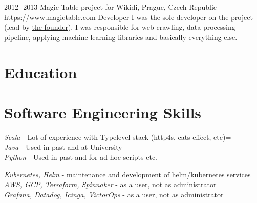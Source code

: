 \documentclass[10pt]{article} %
\begin{document}

    \job
    {2012 -}{2013}
    {Magic Table project for Wikidi, Prague, Czech Republic}
    {https://www.magictable.com}
    {Developer}
    {I was the sole developer on the project (lead by \href{https://michal.illich.cz/}{the founder}). I was responsible for web-crawling, data processing pipeline, applying machine learning libraries and basically everything else. \\
    }




    \section{Education}




    \section{Software Engineering Skills}

    {
        \textit{Scala} - Lot of experience with Typelevel stack (http4s, cats-effect, etc)=\\
    \textit{Java} - Used in past and at University\\
    \textit{Python} - Used in past and for ad-hoc scripts etc.\\
    }


    {
        \textit{Kubernetes, Helm} - maintenance and development of helm/kubernetes services\\
        \textit{AWS, GCP, Terraform, Spinnaker} - as a user, not as administrator \\
    \textit{Grafana, Datadog, Icinga, VictorOps} - as a user, not as administrator \\
    }
\end{document}
